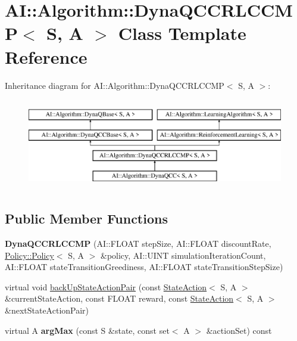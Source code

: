 \hypertarget{classAI_1_1Algorithm_1_1DynaQCCRLCCMP}{\section{A\-I\-:\-:Algorithm\-:\-:Dyna\-Q\-C\-C\-R\-L\-C\-C\-M\-P$<$ S, A $>$ Class Template Reference}
\label{classAI_1_1Algorithm_1_1DynaQCCRLCCMP}
}
Inheritance diagram for A\-I\-:\-:Algorithm\-:\-:Dyna\-Q\-C\-C\-R\-L\-C\-C\-M\-P$<$ S, A $>$\-:\begin{figure}[H]
\begin{center}
\leavevmode
\includegraphics[height=4.000000cm]{classAI_1_1Algorithm_1_1DynaQCCRLCCMP}
\end{center}
\end{figure}
\subsection*{Public Member Functions}
\begin{DoxyCompactItemize}
\item 
\hypertarget{classAI_1_1Algorithm_1_1DynaQCCRLCCMP_a892dd156f280dd375d7f248258531043}{{\bfseries Dyna\-Q\-C\-C\-R\-L\-C\-C\-M\-P} (A\-I\-::\-F\-L\-O\-A\-T step\-Size, A\-I\-::\-F\-L\-O\-A\-T discount\-Rate, \hyperlink{classAI_1_1Algorithm_1_1Policy_1_1Policy}{Policy\-::\-Policy}$<$ S, A $>$ \&policy, A\-I\-::\-U\-I\-N\-T simulation\-Iteration\-Count, A\-I\-::\-F\-L\-O\-A\-T state\-Transition\-Greediness, A\-I\-::\-F\-L\-O\-A\-T state\-Transition\-Step\-Size)}\label{classAI_1_1Algorithm_1_1DynaQCCRLCCMP_a892dd156f280dd375d7f248258531043}

\item 
virtual void \hyperlink{classAI_1_1Algorithm_1_1DynaQCCRLCCMP_aebff9b81db5bd2ae33bd3d6662539bc0}{back\-Up\-State\-Action\-Pair} (const \hyperlink{classAI_1_1StateAction}{State\-Action}$<$ S, A $>$ \&current\-State\-Action, const F\-L\-O\-A\-T reward, const \hyperlink{classAI_1_1StateAction}{State\-Action}$<$ S, A $>$ \&next\-State\-Action\-Pair)
\item 
\hypertarget{classAI_1_1Algorithm_1_1DynaQCCRLCCMP_a145fa4fdba2289842a77c9d483a42ef2}{virtual A {\bfseries arg\-Max} (const S \&state, const set$<$ A $>$ \&action\-Set) const }\label{classAI_1_1Algorithm_1_1DynaQCCRLCCMP_a145fa4fdba2289842a77c9d483a42ef2}

\end{DoxyCompactItemize}
